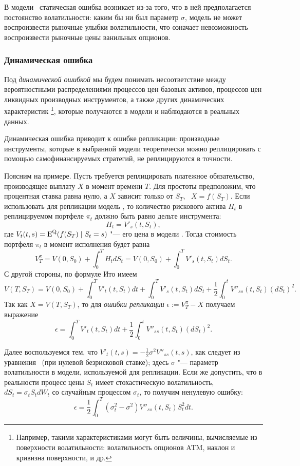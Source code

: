 В модели \bs\ статическая ошибка возникает из-за того, что в ней предполагается постоянство волатильности:
каким бы ни был параметр $\sigma$, модель не может воспроизвести рыночные улыбки волатильности, что означает невозможность воспроизвести рыночные цены ванильных опционов.


\subsubsection{Динамическая ошибка}

Под \emph{динамической ошибкой} мы будем понимать несоответствие между вероятностными распределениями процессов цен базовых активов, процессов цен ликвидных производных инструментов, а также других динамических характеристик%
\footnote{Например, такими характеристиками могут быть величины, вычисляемые из поверхности волатильности: волатильность опционов ATM, наклон и кривизна поверхности, и др.}, которые получаются в модели и наблюдаются в реальных данных. 

Динамическая ошибка приводит к ошибке репликации: производные инструменты, которые в выбранной модели теоретически можно реплицировать с помощью самофинансируемых стратегий, не реплицируются в точности.

Поясним на примере.
Пусть требуется реплицировать платежное обязательство, производящее выплату $X$ в момент времени $T$.
Для простоты предположим, что процентная ставка равна нулю, а $X$ зависит только от $S_T$, \te\ $X=f(S_T)$.
Если использовать для репликации модель \bs, то количество рискового актива $H_t$ в реплицируемом портфеле $\pi_t$ должно быть равно дельте инструмента:
\[
H_t = V'_s(t,S_t),
\]
где $V_t(t,s) = \operatorname{E}^{\mathrm{Q}} (f(S_T) \mid S_t=s)$ "--- его цена в модели \bs.
Тогда стоимость портфеля $\pi_t$ в момент исполнения будет равна
\[
V_T^\pi = V(0,S_0) + \int_0^T H_t d S_t = V(0,S_0) + \int_0^T V'_s(t,S_t) d S_t.
\]
С другой стороны, по формуле Ито имеем
\[
V(T,S_T) = V(0,S_0) + \int_0^T V'_t(t,S_t) dt + \int_0^T V'_s(t,S_t) d S_t + \frac12 \int_0^t V''_{ss}(t,S_t) (dS_t)^2.
\]
Так как $X=V(T,S_T)$, то для \emph{ошибки репликации} $\epsilon := V_T^\pi - X$ получаем выражение
\[
\epsilon = \int_0^T V'_t(t,S_t) dt + \frac12 \int_0^t V''_{ss}(t,S_t) (dS_t)^2.
\]

Далее воспользуемся тем, что $V'_t(t,s) = -\frac12 \sigma^2 V''_{ss}(t,s)$, как следует из уравнения \bs\ (при нулевой безрисковой ставке); здесь $\sigma$ "--- параметр волатильности в модели, используемой для репликации.
Если же допустить, что в реальности процесс цены $S_t$ имеет стохастическую волатильность, \te\ $dS_t = \sigma_t S_t d W_t$ со случайным процессом $\sigma_t$, то получим ненулевую ошибку:
\[
\epsilon = \frac12 \int_0^T (\sigma_t^2 - \sigma^2) V''_{ss}(t,S_t)S_t^2 dt.
\]

